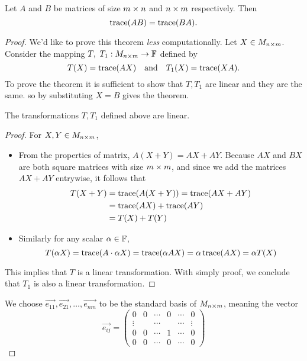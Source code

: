 \begin{homework}
  Let $A$ and $B$ be matrices of size $m\times n$ and $n\times m$ 
  respectively. Then \[\operatorname{trace}(AB)=\operatorname{trace}(BA).\]
\end{homework}
\begin{proof}
  We'd like to prove this theorem \emph{less} computationally.
  Let $X\in M_{n\times m}$. Consider the mapping
  $T,~T_1: M_{n\times m}\to\mathbb{F}$ defined by
  \[
    T(X)=\operatorname{trace}(AX)
    \quad\text{and}\quad
    T_1(X)=\operatorname{trace}(XA).
  \]
  To prove the theorem it is sufficient to show that 
  $T,T_1$ are linear and they are the same.
  so by substituting $X=B$ gives the theorem.
  \begin{claim}
    The transformations $T,T_1$ defined above are linear.
  \end{claim}
  \begin{proof}
    For $X,Y\in M_{n\times m}$,
    \begin{itemize}
      \item From the properties of matrix, $A(X+Y)=AX+AY$. 
        Because $AX$ and $BX$ are both square matrices with 
        size $m\times m$, and since we add the matrices $AX+AY$
        entrywise, it follows that
        \begin{align*}
          T(X+Y)&=\operatorname{trace}(A(X+Y))=\operatorname{trace}(AX+AY)\\
                &=\operatorname{trace}(AX)+\operatorname{trace}(AY)\\
                &=T(X)+T(Y)
        \end{align*}
      \item Similarly for any scalar $\alpha\in\mathbb{F}$,
        \[
          T(\alpha X)=\operatorname{trace}(A\cdot\alpha X)
          =\operatorname{trace}(\alpha AX)=\alpha\operatorname{trace}(AX)=\alpha T(X)
        \]
    \end{itemize}
    This implies that $T$ is a linear transformation. With simply
    proof, we conclude that $T_1$ is also a linear transformation.
  \end{proof}
  We choose $\vec{e_{11}},\vec{e_{21}},\dots,\vec{e_{nm}}$ to be 
  the standard basis of $M_{n\times m}$, meaning the vector
  \[
    \vec{e_{ij}}=
    \begin{pmatrix}
      0 & 0 & \cdots & 0 & \cdots & 0\\
      \vdots  & & \cdots & & \cdots & \vdots\\
      0 & 0 & \cdots & 1 & \cdots & 0\\
      0 & 0 & \cdots & 0 & \cdots & 0
    \end{pmatrix}
\]
\end{proof}
